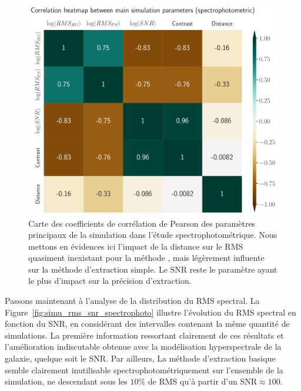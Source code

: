 \documentclass[../main/main.tex]{subfiles}
\begin{document}
\begin{figure}[ht]
  \begin{minipage}[c]{0.6\textwidth}
    \includegraphics[width=\textwidth]{../figures/08_simu/corrheatmap_simu_params_spectrophoto.pdf}
  \end{minipage}\hfill
  \begin{minipage}[c]{0.38\textwidth}
    \caption[Corrélation des paramètres de la
    simulation (spectrophotométrique).]{Carte des coefficients de corrélation de Pearson des
      paramètres principaux de la
    simulation dans l'étude spectrophotométrique. Nous mettons en évidences ici l'impact de la distance
    sur le RMS quasiment inexistant pour la méthode \hypergal, mais
    légèrement influente sur la méthode d'extraction simple. Le SNR
    reste le paramètre ayant le plus d'impact sur la précision d'extraction.}\label{fig:corrheatmap_simuparams_spectrophoto}
  \end{minipage}
\end{figure}


Passons maintenant à l'analyse de la distribution du RMS spectral.
La Figure~\ref{fig:simu_rms_snr_spectrophoto} illustre l'évolution du
RMS spectral en fonction du SNR, en considérant des intervalles
contenant la même quantité de simulations.
La première information ressortant clairement de ces résultats et
l'amélioration indiscutable obtenue avec la modélisation hyperspectrale
de la galaxie, quelque soit le SNR. Par ailleurs, La méthode d'extraction basique
semble clairement inutilisable spectrophotométriquement sur l'ensemble
de la simulation, ne descendant sous les $10\%$ de RMS qu'à partir d'un
SNR$\approx100$.
\end{document}
